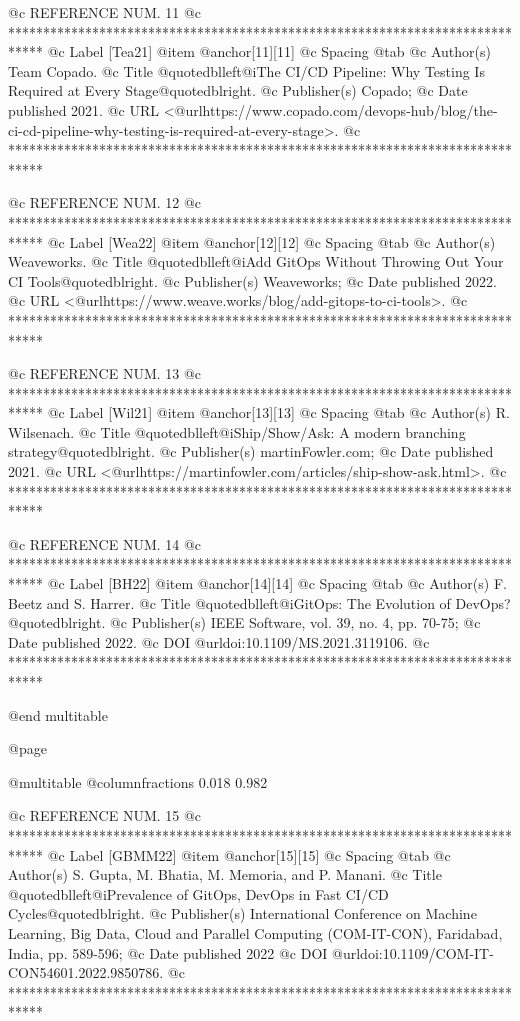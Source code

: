 @c REFERENCE NUM. 11
@c *****************************************************************************
@c Label [Tea21]
@item @anchor{[11]}[11]
@c Spacing
@tab
@c Author(s)
Team Copado.
@c Title
@quotedblleft{}@i{The CI/CD Pipeline: Why Testing Is Required at Every Stage}@quotedblright{}.
@c Publisher(s)
Copado;
@c Date published
2021.
@c URL
<@url{https://www.copado.com/devops-hub/blog/the-ci-cd-pipeline-why-testing-is-required-at-every-stage}>.
@c *****************************************************************************

@c REFERENCE NUM. 12
@c *****************************************************************************
@c Label [Wea22]
@item @anchor{[12]}[12]
@c Spacing
@tab
@c Author(s)
Weaveworks.
@c Title
@quotedblleft{}@i{Add GitOps Without Throwing Out Your CI Tools}@quotedblright{}.
@c Publisher(s)
Weaveworks;
@c Date published
2022.
@c URL
<@url{https://www.weave.works/blog/add-gitops-to-ci-tools}>.
@c *****************************************************************************

@c REFERENCE NUM. 13
@c *****************************************************************************
@c Label [Wil21]
@item @anchor{[13]}[13]
@c Spacing
@tab
@c Author(s)
R. Wilsenach.
@c Title
@quotedblleft{}@i{Ship/Show/Ask: A modern branching strategy}@quotedblright{}.
@c Publisher(s)
martinFowler.com;
@c Date published
2021.
@c URL
<@url{https://martinfowler.com/articles/ship-show-ask.html}>.
@c *****************************************************************************

@c REFERENCE NUM. 14
@c *****************************************************************************
@c Label [BH22]
@item @anchor{[14]}[14]
@c Spacing
@tab
@c Author(s)
F. Beetz and S. Harrer.
@c Title
@quotedblleft{}@i{GitOps: The Evolution of DevOps?}@quotedblright{}.
@c Publisher(s)
IEEE Software, vol. 39, no. 4, pp. 70-75;
@c Date published
2022.
@c DOI
@url{doi:10.1109/MS.2021.3119106}.
@c *****************************************************************************

@end multitable

@page

@multitable @columnfractions 0.018 0.982

@c REFERENCE NUM. 15
@c *****************************************************************************
@c Label [GBMM22]
@item @anchor{[15]}[15]
@c Spacing
@tab
@c Author(s)
S. Gupta, M. Bhatia, M. Memoria, and P. Manani.
@c Title
@quotedblleft{}@i{Prevalence of GitOps, DevOps in Fast CI/CD Cycles}@quotedblright{}.
@c Publisher(s)
International Conference on Machine Learning, Big Data, Cloud and Parallel Computing (COM-IT-CON), Faridabad, India, pp. 589-596;
@c Date published
2022
@c DOI
@url{doi:10.1109/COM-IT-CON54601.2022.9850786}.
@c *****************************************************************************

